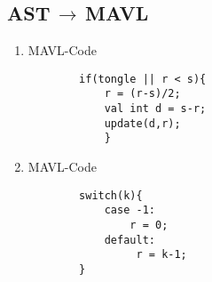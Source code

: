 \documentclass[twoside,colorbacktitle,accentcolor=tud2b]{tudexercise}
\begin{document}
  \subsection{AST$\,\to\,$MAVL}
    \begin{enumerate}
      \item MAVL-Code
      \begin{lstlisting}
      	if(tongle || r < s){
      		r = (r-s)/2;
      		val int d = s-r;
      		update(d,r);
      		}
   \end{lstlisting}
      \item MAVL-Code
      	\begin{lstlisting}
      	switch(k){
      		case -1:
      			r = 0;
      		default:
      			 r = k-1;      		
      	}
      	\end{lstlisting}
      
    \end{enumerate}
\end{document}
